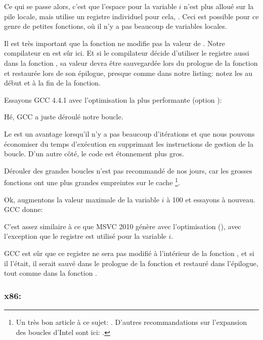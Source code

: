 Ce qui se passe alors, c'est que l'espace pour la variable $i$ n'est plus alloué
sur la pile locale, mais utilise un registre individuel pour cela, \ESI. Ceci est
possible pour ce genre de petites fonctions, où il n'y a pas beaucoup de variables
locales.

Il est très important que la fonction \ttf ne modifie pas la valeur de \ESI.
Notre compilateur en est sûr ici.
Et si le compilateur décide d'utiliser le registre \ESI aussi dans la fonction \ttf,
sa valeur devra être sauvegardée lors du prologue de la fonction et restaurée lors
de son épilogue, presque comme dans notre listing: notez les 
au début et à la fin de la fonction.

Essayons GCC 4.4.1 avec l'optimisation la plus performante (option \Othree):




Hé, GCC a juste déroulé notre boucle.

Le  est un avantage lorsqu'il n'y a pas
beaucoup d'itérations et que nous pouvons économiser du temps d'exécution en supprimant
les instructions de gestion de la boucle.
D'un autre côté, le code est étonnement plus gros.

Dérouler des grandes boucles n'est pas recommandé de nos jours, car les grosses fonctions
ont une plus grandes empreintes sur le cache%
%
\footnote{Un très bon article à ce sujet: \DrepperMemory.
D'autres recommandations sur l'expansion des boucles d'Intel sont ici:
.}.

Ok, augmentons la valeur maximale de la variable $i$ à 100 et essayons à nouveau.
GCC donne:



C'est assez similaire à ce que MSVC 2010 génère avec l'optimisation (\Ox), avec l'exception
que le registre \EBX est utilisé pour la variable $i$.

GCC est sûr que ce registre ne sera pas modifié à l'intérieur de la fonction \ttf,
et si il l'était, il serait sauvé dans le prologue de la fonction et restauré dans
l'épilogue, tout comme dans la fonction \main.

\clearpage
\subsubsection{x86: \olly}
\myindex{\olly}

